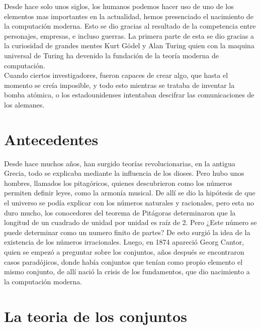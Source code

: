 \documentclass[11pt,letterpaper]{article}
\begin{document}

Desde hace solo unos siglos, los humanos podemos hacer uso de uno de los elementos mas importantes en la actualidad, hemos presenciado el nacimiento de la computación moderna. Esto se dio gracias al resultado de la competencia entre personajes, empresas, e incluso guerras. La primera parte de esta se dio gracias a la curiosidad de grandes mentes Kurt Gödel y Alan Turing quien con la maquina universal de Turing ha devenido la fundación de la teoría moderna de computación.\\
 Cuando ciertos investigadores, fueron capaces de crear algo, que hasta el momento se creía imposible, y todo esto mientras se trataba de inventar la bomba atómica, o los estadounidenses intentaban descifrar las comunicaciones de los alemanes.

\section*{Antecedentes}
Desde hace muchos años, han surgido teorías revolucionarias, en la antigua Grecia, todo se explicaba mediante la influencia de los dioses. Pero hubo unos hombres, llamados los pitagóricos, quienes descubrieron como los números permiten definir leyes, como la armonía musical. De allí se dio la hipótesis de que el universo se podía explicar con los números naturales y racionales, pero esta no duro mucho, los conocedores del teorema de Pitágoras determinaron que la longitud de un cuadrado de unidad por unidad es raíz de 2. Pero ¿Este número se puede determinar como un numero finito de partes? De esto surgió la idea de la existencia de los números irracionales. Luego, en 1874 apareció Georg Cantor, quien se empezó a preguntar sobre los conjuntos, años después se encontraron casos paradójicos, donde había conjuntos que tenían como propio elemento el mismo conjunto, de allí nació la crisis de los fundamentos, que dio nacimiento a la computación moderna. 

\section{La teoria de los conjuntos}
\end{document}
